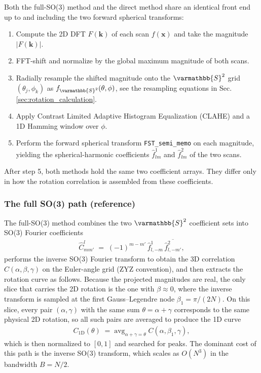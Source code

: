 Both the full-SO(3) method and the direct method share an identical front end up
to and including the two forward spherical transforms:
\begin{enumerate}
    \item Compute the 2D DFT $F(\textbf{k})$ of each scan $f(\textbf{x})$ and take
          the magnitude $|F(\textbf{k})|$.
    \item FFT-shift and normalize by the global maximum magnitude of both scans.
    \item Radially resample the shifted magnitude onto the
          $\varmathbb{S}^{2}$ grid $(\theta_j,\phi_k)$ as
          $f_{\varmathbb{S}^{2}}(\theta,\phi)$, see the resampling equations in
          Sec.\,\ref{sec:rotation_calculation}.
    \item Apply Contrast Limited Adaptive Histogram Equalization (CLAHE) and a
          1D Hamming window over $\phi$.
    \item Perform the forward spherical transform
          \texttt{FST\_semi\_memo} on each magnitude, yielding the
          spherical-harmonic coefficients
          $\hat{f}^{1}_{lm}$ and $\hat{f}^{2}_{lm}$ of the two scans.
\end{enumerate}
After step 5, both methods hold the same two coefficient arrays. They differ
only in how the rotation correlation is assembled from these coefficients.

\subsubsection{The full SO(3) path (reference)}
\label{sec:direct_so3path}

The full-SO(3) method combines the two $\varmathbb{S}^{2}$ coefficient sets into
SO(3) Fourier coefficients
\begin{align}
    \hat{C}^{l}_{mm'} \;=\; (-1)^{m-m'}\,\hat{f}^{1}_{l,-m}\,
                          \overline{\hat{f}^{2}_{l,-m'}},
    \label{eq:so3coef}
\end{align}
performs the inverse SO(3) Fourier transform to obtain the 3D correlation
$C(\alpha,\beta,\gamma)$ on the Euler-angle grid (ZYZ convention), and then
extracts the rotation curve as follows. Because the projected magnitudes are
real, the only slice that carries the 2D rotation is the one with $\beta\approx
0$, where the inverse transform is sampled at the first Gauss--Legendre node
$\beta_{1}=\pi/(2N)$. On this slice, every pair $(\alpha,\gamma)$ with the same
sum $\theta=\alpha+\gamma$ corresponds to the same physical 2D rotation, so all
such pairs are averaged to produce the 1D curve
\begin{align}
    C_{\text{1D}}(\theta) \;=\; \text{avg}_{\alpha+\gamma=\theta}\;
        C(\alpha,\beta_{1},\gamma),
    \label{eq:so3_collapse}
\end{align}
which is then normalized to $[0,1]$ and searched for peaks. The dominant cost of
this path is the inverse SO(3) transform, which scales as
$O(N^{3})$ in the bandwidth $B=N/2$.

